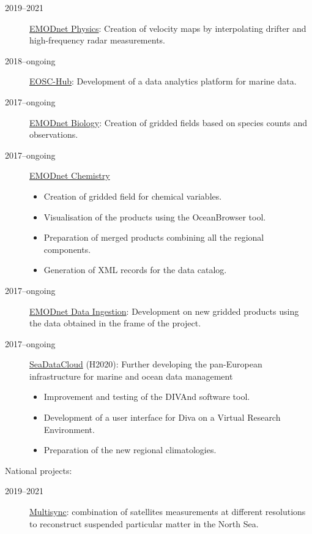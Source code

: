 \documentclass[10pt,a4paper,svgnames]{article}
\begin{document}
\begin{description}
\begin{description}
\item[2019--2021] \href{https://www.emodnet-physics.eu}{EMODnet Physics}: Creation of velocity maps by interpolating drifter and high-frequency radar measurements. 


\item[2018--ongoing] \href{https://www.eosc-hub.eu}{EOSC-Hub}: Development of a data analytics platform for marine data.

\item[2017--ongoing] \href{https://emodnet-biology.eu}{EMODnet Biology}: Creation of gridded fields based on species counts and observations.

\item[2017--ongoing] \href{https://www.emodnet-chemistry.eu}{EMODnet Chemistry} 
\begin{itemize}
\item Creation of gridded field for chemical variables.
\item Visualisation of the products using the OceanBrowser tool.
\item Preparation of merged products combining all the regional components.
\item Generation of XML records for the data catalog.
\end{itemize}

\item[2017--ongoing] \href{https://www.emodnet-ingestion.eu}{EMODnet Data Ingestion}: Development on new gridded products using the data obtained in the frame of the project.

\item[2017--ongoing] \href{https://www.seadatanet.org}{SeaDataCloud} (H2020): Further developing the pan-European infrastructure for marine and ocean data management
\begin{itemize}
\item Improvement and testing of the DIVAnd software tool.
\item Development of a user interface for Diva on a Virtual Research Environment.
\item Preparation of the new regional climatologies.
\end{itemize}

\end{description}
National projects:
\begin{description}
\item[2019--2021] \href{https://odnature.naturalsciences.be/multi-sync/en/}{Multisync}: combination of satellites measurements at different resolutions to reconstruct suspended particular matter in the North Sea.
\end{description}


\end{description}
\end{document}
